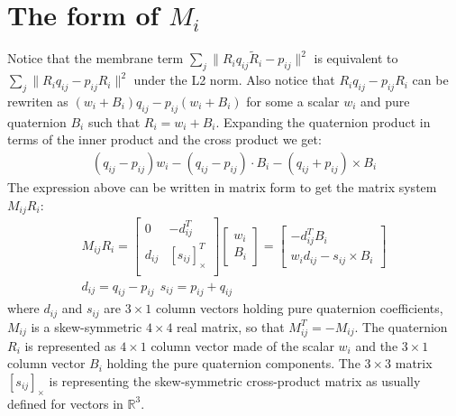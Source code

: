 \documentclass{birkjour}
\numberwithin{equation}{section}
\begin{document}
 \section{The form of $M_i$}
 \label{section:the_form_of_arap_matrix}

Notice that the membrane term $\sum_j \|R_i q_{ij} \tilde R_i - p_{ij} \|^2$ is equivalent to $\sum_j  \|R_i q_{ij} - p_{ij} R_i\|^2$ under the L2 norm. Also notice that  $R_i q_{ij} - p_{ij} R_i$ can be rewriten as $(w_i + B_i) q_{ij}  - p_{ij} (w_i + B_i)$ for some a scalar $w_i$ and pure quaternion $B_i$ such that $R_i = w_i + B_i$. Expanding the quaternion product in terms of the inner product and the cross product we get:
\begin{eqnarray}
     (q_{ij} - p_{ij}) w_i - (q_{ij} - p_{ij}) \cdot B_i - (q_{ij} + p_{ij}) \times B_i
\end{eqnarray}
The expression above can be written in matrix form to get the matrix system $M_{ij} R_i$:
\begin{eqnarray}
	M_{ij} R_i =
	\left[\begin{array}{cc}
		0        &       -d_{ij}^T \\
		d_{ij}  &   \left[ s_{ij} \right]^T_\times \\
	\end{array}\right]
	\left[\begin{array}{c} 
		w_i \\
		B_i
	\end{array}\right] = 
	\left[\begin{array}{c}
		-d_{ij}^T B_i \\
		w_i d_{ij} - s_{ij} \times B_i 
	\end{array}\right]\\
	d_{ij} = q_{ij} - p_{ij} \ \ s_{ij} = p_{ij} + q_{ij}  \nonumber
\end{eqnarray}
where $d_{ij}$ and $s_{ij}$ are $3 \times 1$ column vectors holding pure quaternion coefficients, $M_{ij}$ is a skew-symmetric $4\times 4$ real matrix, so that $M_{ij}^T = -M_{ij}$. The quaternion $R_i$ is represented as $4 \times 1$ column vector made of the scalar $w_i$ and the $3 \times 1$ column vector $B_i$ holding the pure quaternion components. The $3\times 3$ matrix $\left[ s_{ij} \right]_\times$ is representing the skew-symmetric cross-product matrix as usually defined for vectors in $\mathbb R^3$.
\end{document}
